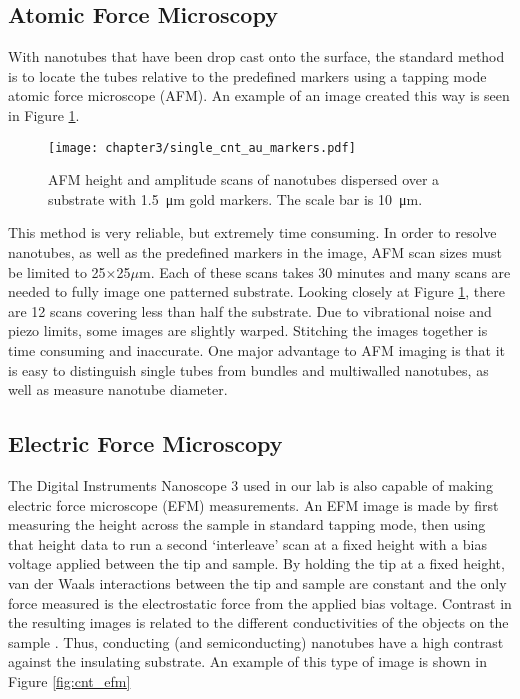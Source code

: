 \subsection{Atomic Force Microscopy}

With nanotubes that have been drop cast onto the surface, the standard method is to locate the tubes relative to the predefined markers using a tapping mode atomic force microscope (AFM). An example of an image created this way is seen in Figure \ref{fig:cnt_au_markers}. 

\begin{figure}
	\centering
	\texttt{[image: chapter3/single\_cnt\_au\_markers.pdf]}
	\caption{AFM height and amplitude scans of nanotubes dispersed over a substrate with \SI{1.5}{\micro\meter} gold markers. The scale bar is \SI{10}{\micro\meter}.}
	\label{fig:cnt_au_markers}
\end{figure}

This method is very reliable, but extremely time consuming. In order to resolve nanotubes, as well as the predefined markers in the image, AFM scan sizes must be limited to 25$\times$25$\mu$m. Each of these scans takes 30 minutes and many scans are needed to fully image one patterned substrate. Looking closely at Figure \ref{fig:cnt_au_markers}, there are 12 scans covering less than half the substrate. Due to vibrational noise and piezo limits, some images are slightly warped. Stitching the images together is time consuming and inaccurate. One major advantage to AFM imaging is that it is easy to distinguish single tubes from bundles and multiwalled nanotubes, as well as measure nanotube diameter.

\subsection{Electric Force Microscopy}
\label{subsec:EFM}

The Digital Instruments Nanoscope 3 used in our lab is also capable of making electric force microscope (EFM) measurements. An EFM image is made by first measuring the height across the sample in standard tapping mode, then using that height data to run a second `interleave' scan at a fixed height with a bias voltage applied between the tip and sample. By holding the tip at a fixed height, van der Waals interactions between the tip and sample are constant and the only force measured is the electrostatic force from the applied bias voltage. Contrast in the resulting images is related to the different conductivities of the objects on the sample \cite{Bockrath2002}. Thus, conducting (and semiconducting) nanotubes have a high contrast against the insulating  substrate. An example of this type of image is shown in Figure \ref{fig:cnt_efm}

